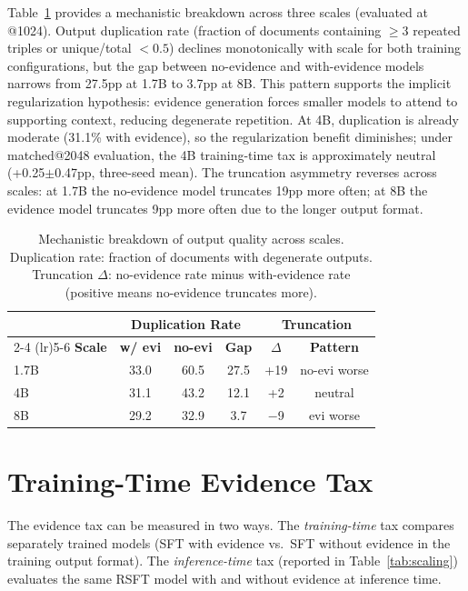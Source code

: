 Table~\ref{tab:mechanistic} provides a mechanistic breakdown across three scales (evaluated at @1024). Output duplication rate (fraction of documents containing $\geq$3 repeated triples or unique/total $< 0.5$) declines monotonically with scale for both training configurations, but the gap between no-evidence and with-evidence models narrows from 27.5pp at 1.7B to 3.7pp at 8B. This pattern supports the implicit regularization hypothesis: evidence generation forces smaller models to attend to supporting context, reducing degenerate repetition. At 4B, duplication is already moderate (31.1\% with evidence), so the regularization benefit diminishes; under matched@2048 evaluation, the 4B training-time tax is approximately neutral (+0.25$\pm$0.47pp, three-seed mean). The truncation asymmetry reverses across scales: at 1.7B the no-evidence model truncates 19pp more often; at 8B the evidence model truncates 9pp more often due to the longer output format.

\begin{table}[t]
\centering
\caption{Mechanistic breakdown of output quality across scales. Duplication rate: fraction of documents with degenerate outputs. Truncation $\Delta$: no-evidence rate minus with-evidence rate (positive means no-evidence truncates more).}
\label{tab:mechanistic}
\small
\begin{tabular}{lccccc}
\toprule
& \multicolumn{3}{c}{\textbf{Duplication Rate}} & \multicolumn{2}{c}{\textbf{Truncation}} \\
\cmidrule(lr){2-4} \cmidrule(lr){5-6}
\textbf{Scale} & \textbf{w/ evi} & \textbf{no-evi} & \textbf{Gap} & \textbf{$\Delta$} & \textbf{Pattern} \\
\midrule
1.7B & 33.0 & 60.5 & 27.5 & +19 & no-evi worse \\
4B & 31.1 & 43.2 & 12.1 & +2 & neutral \\
8B & 29.2 & 32.9 & 3.7 & $-$9 & evi worse \\
\bottomrule
\end{tabular}
\end{table}


\section{Training-Time Evidence Tax}
\label{sec:training_tax}

The evidence tax can be measured in two ways. The \emph{training-time} tax compares separately trained models (SFT with evidence vs.\ SFT without evidence in the training output format). The \emph{inference-time} tax (reported in Table~\ref{tab:scaling}) evaluates the same RSFT model with and without evidence at inference time.

